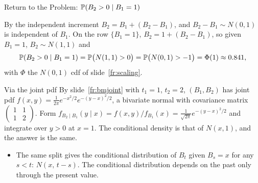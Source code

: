 \begin{frame}{Return to the Problem: $\mathbb{P}(B_2>0\mid B_1=1)$}
  \label{fr:bmcond}
  \small
  \begin{block}{By the independent increment}
    $B_2=B_1+(B_2-B_1)$, and $B_2-B_1\sim N(0,1)$ is independent of $B_1$. On the row $\{B_1=1\}$, $B_2=1+(B_2-B_1)$, so given $B_1=1$, $B_2\sim N(1,1)$ and
    \[
      \mathbb{P}(B_2>0\mid B_1=1)=\mathbb{P}\big(N(1,1)>0\big)=\mathbb{P}\big(N(0,1)>-1\big)=\Phi(1)\approx0.841,
    \]
    with $\Phi$ the $N(0,1)$ cdf of slide~\ref{fr:scaling}.
  \end{block}
  \begin{block}{Via the joint pdf}
    By slide~\ref{fr:bmjoint} with $t_1=1$, $t_2=2$, $(B_1,B_2)$ has joint pdf $f(x,y)=\frac1{2\pi}e^{-x^2/2}e^{-(y-x)^2/2}$, a bivariate normal with covariance matrix $\begin{pmatrix}1&1\\1&2\end{pmatrix}$. Form $f_{B_2\mid B_1}(y\mid x)=f(x,y)/f_{B_1}(x)=\frac1{\sqrt{2\pi}}e^{-(y-x)^2/2}$ and integrate over $y>0$ at $x=1$. The conditional density is that of $N(x,1)$, and the answer is the same.
  \end{block}
  \begin{itemize}
    \item The same split gives the conditional distribution of $B_t$ given $B_s=x$ for any $s<t$: $N(x,\,t-s)$. The conditional distribution depends on the past only through the present value.
  \end{itemize}
\end{frame}

